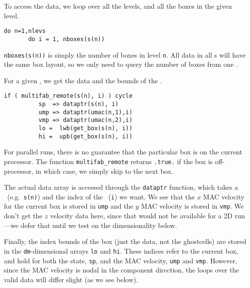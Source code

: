 To access the data, we loop over all the levels, and all the boxes in
the given level.
\begin{lstlisting}[language={[95]fortran},mathescape=false]
    do n=1,nlevs
       do i = 1, nboxes(s(n))
\end{lstlisting}
{\tt nboxes(s(n))} is simply the number of boxes in level {\tt n}.
All data in all \multifab s will have the same box layout, so we only
need to query the number of boxes from one \multifab.

For a given \boxtype, we get the data and the bounds of the \boxtype.
\begin{lstlisting}[language={[95]fortran},mathescape=false]
          if ( multifab_remote(s(n), i) ) cycle
          sp  => dataptr(s(n), i)
          ump => dataptr(umac(n,1),i)
          vmp => dataptr(umac(n,2),i)
          lo =  lwb(get_box(s(n), i))
          hi =  upb(get_box(s(n), i))
\end{lstlisting}

\noindent For parallel runs, there is no guarantee that the particular
box is on the current processor.  The function {\tt multifab\_remote}
returns {\tt .true.} if the box is off-processor, in which case, we 
simply skip to the next box.

The actual data array is accessed through the {\tt dataptr} function,
which takes a \multifab\ (e.g.\ {\tt s(n)}) and the index of the
\boxtype\ ({\tt i}) we want.  We see that the $x$ MAC velocity for the
current box is stored in {\tt ump} and the $y$ MAC velocity is stored
in {\tt vmp}.  We don't get the $z$ velocity data here, since that
would not be available for a 2D run---we defer that until we test on
the dimensionality below.

Finally, the index bounds of the box (just the data, not the ghostcells) are 
stored in the {\tt dm}-dimensional arrays {\tt lo} and {\tt hi}.  These indices
refer to the current box, and hold for both the state, {\tt sp}, and the MAC
velocity, {\tt ump} and {\tt vmp}.  However, since the MAC velocity is nodal
in the component direction, the loops over the valid data will differ
slight (as we see below).

